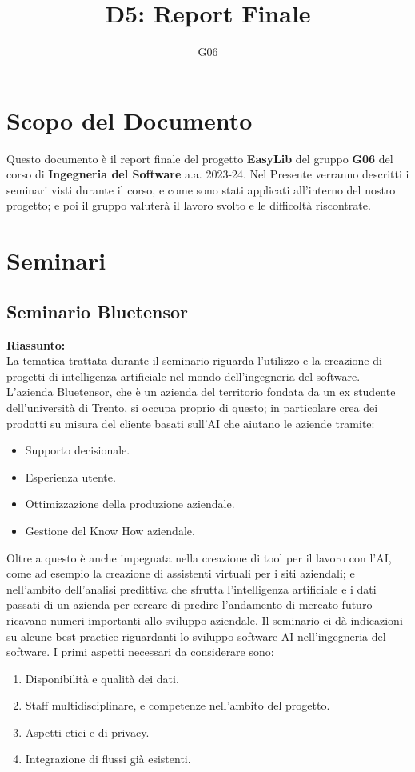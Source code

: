 \documentclass{article}
\title{D5: Report Finale}
\author{G06}
\begin{document}
\maketitle
\tableofcontents
\newpage


\section{Scopo del Documento}
Questo documento è il report finale del progetto \textbf{EasyLib} del gruppo \textbf{G06} del corso di \textbf{Ingegneria del Software} a.a. 2023-24.
Nel Presente verranno descritti i seminari visti durante il corso, e come sono stati applicati all'interno del nostro progetto; e poi il gruppo valuterà il lavoro svolto e le difficoltà riscontrate.
\\
\section{Seminari}

\subsection{Seminario Bluetensor}
\textbf{Riassunto:}
\\ La tematica trattata durante il seminario riguarda l'utilizzo e la creazione di progetti di intelligenza artificiale nel mondo dell'ingegneria del software. L'azienda Bluetensor, che è un azienda del territorio fondata da un ex studente dell'università di Trento, si occupa proprio di questo; in particolare crea dei prodotti su misura del cliente basati sull'AI che aiutano le aziende tramite:
\begin{itemize}
    \item Supporto decisionale.
    \item Esperienza utente.
    \item Ottimizzazione della produzione aziendale.
    \item Gestione del Know How aziendale.
\end{itemize}
 Oltre a questo è anche impegnata nella creazione di tool per il lavoro con l'AI, come ad esempio la creazione di assistenti virtuali per i siti aziendali; e nell'ambito dell'analisi predittiva che sfrutta l'intelligenza artificiale e i dati passati di un azienda per cercare di predire l'andamento di mercato futuro ricavano numeri importanti allo sviluppo aziendale.
 Il seminario ci dà indicazioni su alcune best practice riguardanti lo sviluppo software AI nell'ingegneria del software. I primi aspetti necessari
 da considerare sono: 
 \begin{enumerate}
     \item Disponibilità e qualità dei dati.
     \item Staff multidisciplinare, e competenze nell'ambito del progetto.
     \item Aspetti etici e di privacy.
     \item Integrazione di flussi già esistenti.
 \end{enumerate}
\end{document}

